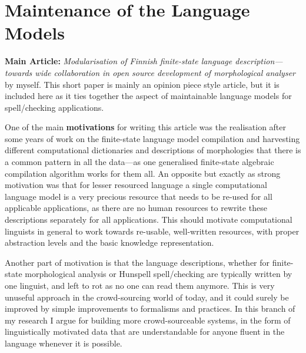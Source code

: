 \documentclass[officiallayout]{unihelcompling}
\begin{document}
\section{Maintenance of the Language Models}
\label{sec:maintenance}

\textbf{Main Article:} \emph{Modularisation of Finnish finite-state language 
description—towards wide collaboration in open source development of
morphological analyser} by myself. This short paper is mainly an opinion
piece style article, but it is included here as it ties together the
aspect of maintainable language models for spell\-/checking applications.

One of the main \textbf{motivations} for writing this article was the
realisation after some years of work on the finite-state language model
compilation and harvesting different computational dictionaries and
descriptions of morphologies that there is a common pattern in all the
data---as one generalised finite-state algebraic compilation algorithm works
for them all. An opposite but exactly as strong motivation was that for lesser
resourced language a single computational language model is a very precious
resource that needs to be re-used for all applicable applications, as there are
no human resources to rewrite these descriptions separately for all
applications. This should motivate computational linguists in general to work
towards re-usable, well-written resources, with proper abstraction levels and
the basic knowledge representation.

Another part of motivation is that the language descriptions, whether for
finite-state morphological analysis or Hunspell spell\-/checking are typically
written by one linguist, and left to rot as no one can read them anymore.  This
is very unuseful approach in the crowd-sourcing world of today, and it could
surely be improved by simple improvements to formalisms and practices.  In this
branch of my research I argue for building more crowd-sourceable systems, in
the form of linguistically motivated data that are understandable for anyone
fluent in the language whenever it is possible.
\end{document}
